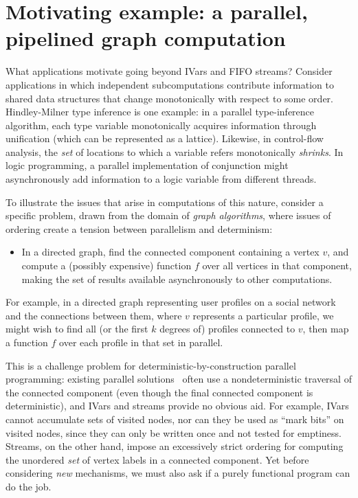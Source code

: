 \section{Motivating example: a parallel, pipelined graph computation}\label{s:lvars-motivation}

What applications motivate going beyond IVars and FIFO streams?
Consider applications in which independent subcomputations contribute
information to shared data structures that change monotonically with
respect to some order.  Hindley-Milner type inference is one example:
in a parallel type-inference algorithm, each type variable
monotonically acquires information through unification (which can be
represented as a lattice). Likewise, in control-flow analysis, the
\emph{set} of locations to which a variable refers monotonically
\emph{shrinks}.  In logic programming, a parallel implementation of
conjunction might asynchronously add information to a logic variable
from different threads.

To illustrate the issues that arise in computations of this nature,
consider a specific problem, drawn from the domain of {\em graph
  algorithms}, where issues of ordering create a tension between
parallelism and determinism:
\begin{itemize}
\item 
  In a directed graph, find the connected component containing a
  vertex $v$, and compute a (possibly expensive) function $f$ over all
  vertices in that component, making the set of results available
  asynchronously to other computations.
\end{itemize}
For example, in a directed graph representing user profiles on a
social network and the connections between them, where $v$ represents
a particular profile, we might wish to find all (or the first $k$
degrees of) profiles connected to $v$, then map a function $f$ over
each profile in that set in parallel.

This is a challenge problem for deterministic-by-construction parallel
programming: existing parallel solutions~\cite{bfs-pbgl} often use a
nondeterministic traversal of the connected component (even though the
final connected component is deterministic), and IVars and streams
provide no obvious aid.  For example, IVars cannot accumulate sets of
visited nodes, nor can they be used as ``mark bits'' on visited nodes,
since they can only be written once and not tested for emptiness.
Streams, on the other hand, impose an excessively strict ordering for
computing the unordered \emph{set} of vertex labels in a connected
component.  Yet before considering \emph{new} mechanisms, we must also
ask if a purely functional program can do the job.

